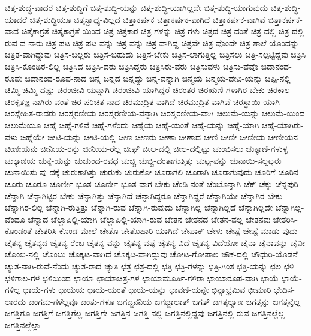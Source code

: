 {ಚಿತ್ತ-ಶುದ್ಧ-ವಾದರೆ
ಚಿತ್ತ-ಶುದ್ಧಿಗೆ
ಚಿತ್ತ-ಶುದ್ಧಿ-ಯನ್ನು
ಚಿತ್ತ-ಶುದ್ಧಿ-ಯಾಗಿಲ್ಲದೇ
ಚಿತ್ತ-ಶುದ್ಧಿ-ಯಾಗುವುದು
ಚಿತ್ತ-ಶುದ್ಧಿ-ಯಾದರೆ
ಚಿತ್ತ-ಶುದ್ಧಿಯೂ
ಚಿತ್ತಸ್ವಾಥ್ಯ-ವಿಲ್ಲದ
ಚಿತ್ತಾಕರ್ಷಕ
ಚಿತ್ತಾಕರ್ಷಕ-ವಾಗಿದೆ
ಚಿತ್ತಾಕರ್ಷಕ-ವಾಗಿವೆ
ಚಿತ್ತಾಕರ್ಷಕ-ವಾದ
ಚಿತ್ತೈಕಾಗ್ರತೆ
ಚಿತ್ತೈಕಾಗ್ರತೆ-ಯಿಂದ
ಚಿತ್ರ
ಚಿತ್ರಕಾರ
ಚಿತ್ರ-ಗಳನ್ನು
ಚಿತ್ರ-ಗಳು
ಚಿತ್ರದ
ಚಿತ್ರ-ದಂತೆ
ಚಿತ್ರ-ದಲ್ಲಿ
ಚಿತ್ರ-ದಲ್ಲಿ-ರುವ-ವ-ನಾರು
ಚಿತ್ರ-ಪಟ
ಚಿತ್ರ-ಪಟ-ವನ್ನು
ಚಿತ್ರ-ವನ್ನು
ಚಿತ್ರ-ವಾಗಿದ್ದ
ಚಿತ್ರವೇ
ಚಿತ್ರ-ವೊಂದೇ
ಚಿತ್ರ-ಶಾಲೆ-ಯೊಂದನ್ನು
ಚಿತ್ರಿತ-ವಾಗಿದ್ದುವು
ಚಿತ್ರಿಸ-ಬಲ್ಲರು
ಚಿತ್ರಿಸ-ಬಹುದು
ಚಿತ್ರಿಸ-ಬೇಕು
ಚಿತ್ರಿಸ-ಲಾಗುತ್ತಿಲ್ಲ
ಚಿತ್ರಿಸಲು
ಚಿತ್ರಿ-ಸಲ್ಪಟ್ಟಿದ್ದವು
ಚಿತ್ರಿಸಿ
ಚಿತ್ರಿಸಿ-ಕೊಂಡಿರ-ಲಿಲ್ಲ
ಚಿತ್ರಿಸಿದ
ಚಿತ್ರಿಸಿ-ದರು
ಚಿತ್ರಿಸಿದ್ದರು
ಚಿತ್ರಿಸಿರು-ವರು
ಚಿತ್ರಿಸುವಳು
ಚಿತ್ರಿಸು-ವೆವೊ
ಚಿದಾನಂದ-ರೂಪಃ
ಚಿದಾನಂದ-ರೂಪ-ನಾದ
ಚಿನ್ನ
ಚಿನ್ನದ
ಚಿನ್ನದ್ದು
ಚಿನ್ನ-ವನ್ನಾಗಿ
ಚಿನ್ಮಯ
ಚಿನ್ಮಯ-ದೇವಿ-ಯನ್ನು
ಚಿಪ್ಪಿ-ನಲ್ಲಿ
ಚಿಮ್ಮಿ
ಚಿಮ್ಮಿ-ದಷ್ಟು
ಚಿರಂಜೀವಿ-ಯನ್ನಾಗಿ
ಚಿರಂಜೀವಿ-ಯಾಗಿದ್ದರೆ
ಚಿರಂತರ
ಚಿರಋಣಿ-ಗಳಾಗಿರ-ಬೇಕು
ಚಿರಕಾಲ
ಚಿರಕೃತಜ್ಞ-ನಾಗಿರು-ವಂತೆ
ಚಿರ-ಪರಿಚಿತ-ನಾದ
ಚಿರಮುದ್ರಿತ-ವಾಗಿದೆ
ಚಿರಮುದ್ರಿತ-ವಾಗಿವೆ
ಚಿರಸ್ಥಾಯಿ-ಯಾಗಿ
ಚಿರಸ್ನೇಹಿತ-ರಾದರು
ಚಿರಸ್ಮರಣೀಯ
ಚಿರಸ್ಮರಣೀಯ-ವನ್ನಾಗಿ
ಚಿರಸ್ಮರಣೀಯ-ವಾಗಿ
ಚಿಲುಮೆ-ಯನ್ನು
ಚಿಲುಮೆ-ಯಿಂದ
ಚಿಲುಮೆಯೂ
ಚಿಹ್ನೆ
ಚಿಹ್ನೆ-ಗಳಿವೆ
ಚಿಹ್ನೆ-ಗಳೆಂದು
ಚಿಹ್ನೆಯ
ಚಿಹ್ನೆ-ಯಂತೆ
ಚಿಹ್ನೆ-ಯನ್ನು
ಚಿಹ್ನೆ-ಯಾಗಿ
ಚಿಹ್ನೆ-ಯಾಗಿರು-ವಳು
ಚಿಹ್ನೆಯೇ
ಚೀಟಿ-ಯನ್ನು
ಚೀಟಿ-ಯಲ್ಲಿ
ಚೀಣ
ಚೀಣರು
ಚೀಣಾ
ಚೀಣಾದ
ಚೀಣಿ
ಚೀಣೀ
ಚೀಣೀಯ
ಚೀಣೀಯನ
ಚೀಣೀಯನು
ಚೀನೀಯ-ರನ್ನು
ಚೀನೀಯ-ರೆಲ್ಲ
ಚೀಫ್
ಚೀಲ-ದಲ್ಲಿ
ಚೀಲ-ದಲ್ಲಿಟ್ಟು
ಚುಂಬಿಸಲು
ಚುಕ್ಕಾಣಿ-ಗಳುಳ್ಳ
ಚುಕ್ಕಾಣಿಯ
ಚುಕ್ಕೆ-ಯನ್ನು
ಚುಚುಂದ-ರವಧ
ಚುಚ್ಚಿ
ಚುಚ್ಚಿ-ದಂತಾಗುತ್ತಿತ್ತು
ಚುಟ್ಟ-ವನ್ನು
ಚುನಾಯಿ-ಸಲ್ಪಟ್ಟರು
ಚುನಾಯಿಸು-ವು-ದಕ್ಕೆ
ಚುರುಕಾಗಿತ್ತು
ಚುರುಕು
ಚುರುಕೋ
ಚೂರಾಗಲಿ
ಚೂರಾಗಿ
ಚೂರಾಗುವುದು
ಚೂರಿಗೆ
ಚೂರಿನ
ಚೂರು
ಚೂರೂ
ಚೂರ್ಣೀ-ಭೂತ
ಚೂರ್ಣೀ-ಭೂತ-ವಾಗ-ಬೇಕು
ಚೆಂಡಿ-ನಂತೆ
ಚೆಂಬೊನ್ನಾಗಿ
ಚೆಕ್
ಚೆಕ್ಕು
ಚೆನ್ನಪುರಿ
ಚೆನ್ನಾಗಿ
ಚೆನ್ನಾಗಿಟ್ಟಿರ-ಬೇಕು
ಚೆನ್ನಾಗಿತ್ತು
ಚೆನ್ನಾಗಿದೆ
ಚೆನ್ನಾಗಿದ್ದರೂ
ಚೆನ್ನಾಗಿದ್ದರೆ
ಚೆನ್ನಾಗಿಯೇ
ಚೆನ್ನಾಗಿರ-ಬೇಕು
ಚೆನ್ನಾಗಿರ-ಲಿಲ್ಲ
ಚೆನ್ನಾಗಿ-ರುತ್ತಿತ್ತು
ಚೆನ್ನಾಗಿ-ರುವ
ಚೆನ್ನಾಗಿ-ರುವುದು
ಚೆನ್ನಾಗಿಲ್ಲ
ಚೆನ್ನಾಗಿಲ್ಲದೆ
ಚೆನ್ನಾಗಿಲ್ಲದೇ
ಚೆನ್ನಾಗಿಲ್ಲ-ವೆಂದೂ
ಚೆನ್ನಾದ
ಚೆಲ್ಲಾಪಿಲ್ಲಿ-ಯಾಗಿ
ಚೆಲ್ಲಾಪಿಲ್ಲಿ-ಯಾಗಿ-ರುವ
ಚೇತನ
ಚೇತನದ
ಚೇತನ-ವಲ್ಲ
ಚೇತನವು
ಚೇತರಿಸಿ-ಕೊಂಡಂತೆ
ಚೇತರಿಸಿ-ಕೊಂಡ-ಮೇಲೆ
ಚೇತೊ
ಚೇತೊಹಾರಿ-ಯಾಗಿದೆ
ಚೇಪಾಕ್
ಚೇಳು
ಚೇಷ್ಟೆ
ಚೇಷ್ಟೆ-ಮಾಡು-ವುದು
ಚೈತನ್ಯ
ಚೈತನ್ಯದ
ಚೈತನ್ಯ-ರೆಂಬ
ಚೈತನ್ಯ-ವನ್ನು
ಚೈತನ್ಯ-ವಷ್ಟೆ
ಚೈತನ್ಯ-ವಿದೆ
ಚೈತನ್ಯ-ವಿದೆಯೋ
ಚೈನಾ
ಚೈನಾವನ್ನು
ಚೈನೀ
ಚೊಂಬಿ-ನಲ್ಲಿ
ಚೊಂಬು
ಚೊಕ್ಕಟ-ವಾಗಿದೆ
ಚೊಕ್ಕಟ-ವಾಗಿದ್ದುವು
ಚೋಟ-ಗೋಪಾಲ
ಚೌಕ-ದಲ್ಲಿ
ಚೌಧುರಿ-ಯೊಡನೆ
ಚ್ಯುತ-ನಾಗಿ-ರುವೆ-ನೆಂದು
ಚ್ಯುತ-ರಾದ
ಚ್ಯುತಿ
ಛತ್ರ
ಛತ್ರ-ದಲ್ಲಿ
ಛತ್ರಿ
ಛತ್ರಿ-ಗಳನ್ನು
ಛತ್ರಿ-ಗಿಂತ
ಛತ್ರಿ-ಯನ್ನು
ಛಲ
ಛಳಿ
ಛಳಿಗಾಲ-ಗಳ
ಛಳಿಯಿಂದ
ಛಾಯಾ
ಛಾಯಾಚಿತ್ರ-ಗಳ
ಛಾಯಾಮೂರ್ತಿ-ಗಳಿರಾ
ಛಾಯಾರೂಪ-ವಾಗಿ
ಛಾಯೆ
ಛಾಯೆ-ಗಳಿಲ್ಲ
ಛಾಯೆ-ಗಳು
ಛಾಯೆಯ
ಛಾಯೆ-ಯಂತೆ
ಛಾಯೆ-ಯನ್ನು
ಛಾವಣಿ-ಯನ್ನೇ
ಛಿನ್ನಾಭ್ರಮಿವ
ಛೀಮಾರಿ
ಛೇದಿಸ-ಲಾರದು
ಜಂಗಮ-ಗಳೆಲ್ಲವೂ
ಜಂತು-ಗಳೂ
ಜಗಜ್ಜನನಿಯ
ಜಗಜ್ಜಾಲಾತ್
ಜಗತ್
ಜಗತ್ಕಲ್ಯಾಣ
ಜಗತ್ತನ್ನು
ಜಗತ್ತನ್ನೆಲ್ಲ
ಜಗತ್ತಿಗೂ
ಜಗತ್ತಿಗೆ
ಜಗತ್ತಿಗೆಲ್ಲ
ಜಗತ್ತಿಗೇ
ಜಗತ್ತಿನ
ಜಗತ್ತಿ-ನಲ್ಲಿ
ಜಗತ್ತಿನಲ್ಲಿದ್ದವು
ಜಗತ್ತಿನಲ್ಲಿ-ರುವ
ಜಗತ್ತಿನಲ್ಲೆಲ್ಲ
ಜಗತ್ತಿನಲ್ಲೆಲ್ಲಾ
}

